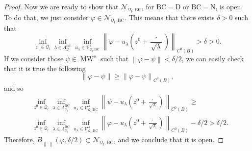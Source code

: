 \documentclass{amsart}
\theoremstyle{definition}
\theoremstyle{remark}
\renewcommand\geq\geqslant
\numberwithin{equation}{section}
\theoremstyle{definition}
\theoremstyle{remark}
\DeclareMathOperator\MW{MW}
\begin{document}
\begin{proof}
	Now we are ready to show that $\mathcal{N}_{\mathcal{Q}_l,\mathrm{BC}}$, for $\mathrm{BC}=\mathrm{D}$ or $\mathrm{BC}=\mathrm{N}$, is open. To do that, we just consider $\varphi\in\mathcal{N}_{\mathcal{Q}_l,\mathrm{BC}}$. This means that there exists $\delta>0$ such that \begin{equation}	\inf_{z^0\in\mathcal{Q}_l}\inf_{\lambda\in\Lambda_{\mathcal{Q}_l}^{\mathrm{BC}}}\inf_{u_\lambda \in\mathcal{V}_{\mathcal{Q}_l,\mathrm{BC}}^\lambda}\left\|\varphi-u_\lambda\left(z^0+\frac{\cdot}{\sqrt{\lambda}}\right)\right\|_{C^0\left(B\right)}>\delta>0.\end{equation}If we consider those $\psi\in\MW^s$ such that $\left\|\varphi-\psi\right\|<\delta/2$, we can easily check that it is true the following
	\begin{equation}
		\left\|\varphi-\psi\right\|\geq \left\|\varphi-\psi\right\|	_{C^0\left(B\right)},
	\end{equation}and so \begin{equation}\begin{aligned}	&\inf_{z^0\in\mathcal{Q}_l}\inf_{\lambda\in\Lambda_{\mathcal{Q}_l}^{\mathrm{BC}}}\inf_{u_\lambda \in\mathcal{V}_{\mathcal{Q}_l,\mathrm{BC}}^\lambda}\left\|\psi-u_\lambda\left(z^0+\frac{\cdot}{\sqrt{\lambda}}\right)\right\|_{C^0\left(B\right)}\geq\\&	\inf_{z^0\in\mathcal{Q}_l}\inf_{\lambda\in\Lambda_{\mathcal{Q}_l}^{\mathrm{BC}}}\inf_{u_\lambda \in\mathcal{V}_{\mathcal{Q}_l,\mathrm{BC}}^\lambda}\left\|\varphi-u_\lambda\left(z^0+\frac{\cdot}{\sqrt{\lambda}}\right)\right\|_{C^0\left(B\right)}-\delta/2>\delta/2.\end{aligned}\end{equation}Therefore, $B_{\left\|\cdot\right\|}\left(\varphi,\delta/2\right)\subset\mathcal{N}_{\mathcal{Q}_l,\mathrm{BC}}$, and we conclude that it is open.
	

\end{proof}
\end{document}
